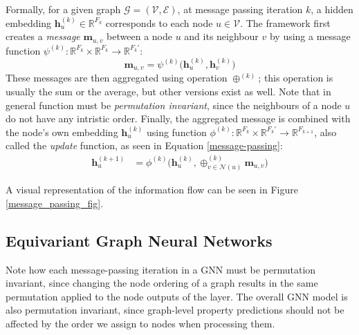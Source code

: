 Formally, for a given graph $\mathcal{G} = (\mathcal{V}, \mathcal{E})$, at message passing iteration $k$, a hidden embedding $\textbf{h}_u^{(k)} \in \mathbb{R}^{F_k}$ corresponds to each node $u \in \mathcal{V}$. 
The framework first creates a \textit{message} $\mathbf{m}_{u,v}$ between a node $u$ and its neighbour $v$ by using a message function $\psi^{(k)}: \mathbb{R}^{F_k}\times\mathbb{R}^{F_k} \rightarrow \mathbb{R}^{F_{k}'}$:
\begin{equation}
    \mathbf{m}_{u, v} = \psi^{(k)}\Big(\textbf{h}_{u}^{(k)}, \textbf{h}_v^{(k)}\Big)
\end{equation}
These messages are then aggregated using operation $\oplus^{(k)}$; 
this operation is usually the sum or the average, but other versions exist as well. Note that in general function must be \textit{permutation invariant}, since the neighbours of a node $u$ do not have any intristic order.
Finally, the aggregated message is combined with the node's own embedding $\mathbf{h}_u^{(k)}$ using function $\phi^{(k)}:\mathbb{R}^{F_k} \times \mathbb{R}^{F_{k}'} \rightarrow \mathbb{R}^{F_{k+1}}$, also called the \textit{update} function, as seen in Equation \ref{message-passing}:
\begin{align}
    \textbf{h}_u^{(k+1)} &= \phi^{(k)}\Big(\textbf{h}_u^{(k)}, \oplus_{v\in \mathcal{N}(u)}^{(k)}\mathbf{m}_{u,v}\Big)
\label{message-passing}
\end{align}

A visual representation of the information flow can be seen in Figure \ref{message_passing_fig}.

\subsection{Equivariant Graph Neural Networks}
Note how each message-passing iteration in a GNN must be permutation invariant, since changing the node ordering of a graph results in the same permutation applied to the node outputs of the layer. 
The overall GNN model is also permutation invariant, since graph-level property predictions should not be affected by the order we assign to nodes when processing them.

